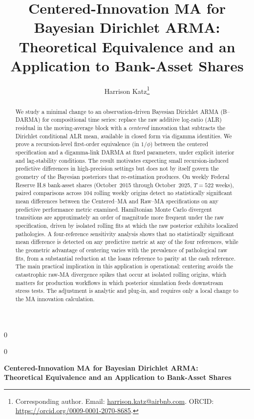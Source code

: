 \documentclass[12pt]{article}
\newcommand{\blind}{0}
\theoremstyle{remark}
\begin{document}
\blind
{
  \title{\bf Centered-Innovation MA for Bayesian Dirichlet ARMA:\\
  Theoretical Equivalence and an Application to Bank-Asset Shares}
\author[1]{Harrison Katz\thanks{Corresponding author. Email: \href{mailto:harrison.katz@airbnb.com}{harrison.katz@airbnb.com}. ORCID: \url{https://orcid.org/0009-0001-2070-8685}.}}
  \maketitle
} \fi

\blind
{
  \bigskip
  \bigskip
  \bigskip
  \begin{center}
    {\LARGE\bf Centered-Innovation MA for Bayesian Dirichlet ARMA:\\
    Theoretical Equivalence and an Application to Bank-Asset Shares}
\end{center}
  \medskip
} \fi

\doublespacing

\begin{abstract}
We study a minimal change to an observation-driven Bayesian Dirichlet ARMA (B--DARMA) for compositional time series: replace the raw additive log-ratio (ALR) residual in the moving-average block with a \emph{centered} innovation that subtracts the Dirichlet conditional ALR mean, available in closed form via digamma identities. We prove a recursion-level first-order equivalence (in $1/\phi$) between the centered specification and a digamma-link DARMA at fixed parameters, under explicit interior and lag-stability conditions. The result motivates expecting small recursion-induced predictive differences in high-precision settings but does not by itself govern the geometry of the Bayesian posteriors that re-estimation produces. On weekly Federal Reserve H.8 bank-asset shares (October~2015 through October~2025, $T=522$ weeks), paired comparisons across $104$ rolling weekly origins detect no statistically significant mean differences between the Centered--MA and Raw--MA specifications on any predictive performance metric examined. Hamiltonian Monte Carlo divergent transitions are approximately an order of magnitude more frequent under the raw specification, driven by isolated rolling fits at which the raw posterior exhibits localized pathologies. A four-reference sensitivity analysis shows that no statistically significant mean difference is detected on any predictive metric at any of the four references, while the geometric advantage of centering varies with the prevalence of pathological raw fits, from a substantial reduction at the loans reference to parity at the cash reference. The main practical implication in this application is operational: centering avoids the catastrophic raw-MA divergence spikes that occur at isolated rolling origins, which matters for production workflows in which posterior simulation feeds downstream stress tests. The adjustment is analytic and plug-in, and requires only a local change to the MA innovation calculation.
\end{abstract}
\end{document}
